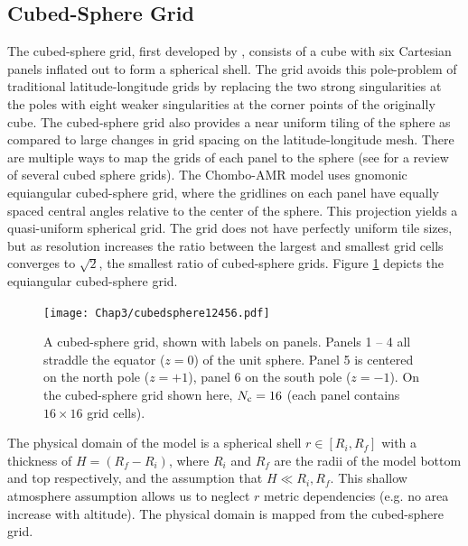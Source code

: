 \subsection{Cubed-Sphere Grid}
The cubed-sphere grid, first developed by \cite{sadourny1972conservative}, consists of a cube with six Cartesian panels inflated out to form a spherical shell.
The grid avoids this pole-problem of traditional latitude-longitude grids by replacing the two strong singularities at the poles with eight weaker singularities at
the corner points of the originally cube. The cubed-sphere grid also provides a near uniform tiling of the sphere as compared to
large changes in grid spacing on the latitude-longitude mesh. 
There are multiple ways to map the grids of each panel to the sphere (see \cite{putman2007finite} for a review
of several cubed sphere grids).  The Chombo-AMR model uses gnomonic equiangular cubed-sphere grid, where the
gridlines on each panel have equally spaced central angles relative to the center of the sphere. This projection
yields a quasi-uniform spherical grid. The grid does not have perfectly uniform tile sizes, but as resolution increases
the ratio between the largest and smallest grid cells converges to $\sqrt{2}$, the smallest ratio of cubed-sphere
grids. Figure \ref{fig:cubedsphere2dmaps} depicts the equiangular cubed-sphere grid.

\begin{figure}[htp]
\centerline{
\texttt{[image: Chap3/cubedsphere12456.pdf]}                                                                                        
}
\caption{
A cubed-sphere grid, shown with labels on panels.                                                                                                             
Panels 1 -- 4 all straddle the equator
($z = 0$) of the unit sphere.
Panel 5 is centered on the north pole ($z = +1$),
panel 6 on the south pole ($z = -1$).
On the cubed-sphere grid shown here,
$N_{\rm c} = 16$ (each panel contains $16 \times 16$ grid cells).
}
\label{fig:cubedsphere2dmaps}
\end{figure}

The physical domain of the model 
is a spherical shell $r \in [R_i,R_f]$ with a thickness of $H = (R_f - R_i)$,
where $R_i$ and $R_f$ are the radii of the model 
bottom and top respectively, and the assumption 
that $H \ll R_i, R_f$. This shallow 
atmosphere assumption allows us to neglect $r$ metric
dependencies (e.g. no area increase with altitude).
The physical domain is mapped from the cubed-sphere grid.


